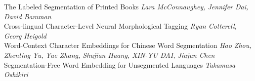 \documentclass{book}
\begin{document}
    \noindent	The Labeled Segmentation of Printed Books \newline 
    {\itshape Lara McConnaughey, Jennifer Dai, David Bamman} \\
    
    \noindent	Cross-lingual Character-Level Neural Morphological Tagging \newline 
    {\itshape Ryan Cotterell, Georg Heigold} \\
    
    \noindent	Word-Context Character Embeddings for Chinese Word Segmentation \newline 
    {\itshape Hao Zhou, Zhenting Yu, Yue Zhang, Shujian Huang, XIN-YU DAI, Jiajun Chen} \\
    
    \noindent	Segmentation-Free Word Embedding for Unsegmented Languages \newline 
    {\itshape Takamasa Oshikiri} \\
    
\vspace*{\fill}
\end{document}
